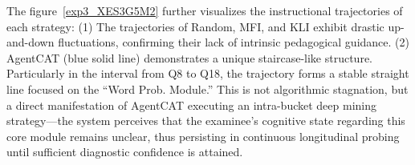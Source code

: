 The figure~\ref{exp3_XES3G5M2} further visualizes the instructional trajectories of each strategy: (1) The trajectories of Random, MFI, and KLI exhibit drastic up-and-down fluctuations, confirming their lack of intrinsic pedagogical guidance. (2) AgentCAT (blue solid line) demonstrates a unique staircase-like structure. Particularly in the interval from Q8 to Q18, the trajectory forms a stable straight line focused on the ``Word Prob. Module.'' This is not algorithmic stagnation, but a direct manifestation of AgentCAT executing an intra-bucket deep mining strategy—the system perceives that the examinee's cognitive state regarding this core module remains unclear, thus persisting in continuous longitudinal probing until sufficient diagnostic confidence is attained.












